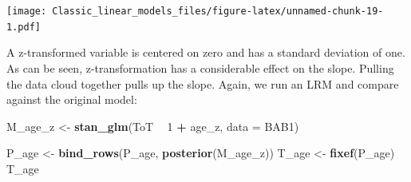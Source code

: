 \documentclass[]{svmono}
\newenvironment{Shaded}{\begin{snugshade}}{\end{snugshade}}
\newcommand{\KeywordTok}[1]{\textcolor[rgb]{0.13,0.29,0.53}{\textbf{#1}}}
\newcommand{\DataTypeTok}[1]{\textcolor[rgb]{0.13,0.29,0.53}{#1}}
\newcommand{\DecValTok}[1]{\textcolor[rgb]{0.00,0.00,0.81}{#1}}
\newcommand{\StringTok}[1]{\textcolor[rgb]{0.31,0.60,0.02}{#1}}
\newcommand{\OperatorTok}[1]{\textcolor[rgb]{0.81,0.36,0.00}{\textbf{#1}}}
\newcommand{\NormalTok}[1]{#1}
\theoremstyle{definition}
\theoremstyle{definition}
\theoremstyle{definition}
\theoremstyle{remark}
\begin{document}
\begin{Shaded}
\end{Shaded}

\texttt{[image: Classic\_linear\_models\_files/figure-latex/unnamed-chunk-19-1.pdf]}

A z-transformed variable is centered on zero and has a standard
deviation of one. As can be seen, z-transformation has a considerable
effect on the slope. Pulling the data cloud together pulls up the slope.
Again, we run an LRM and compare against the original model:

\begin{Shaded}
\begin{Highlighting}[]
\NormalTok{M_age_z <-}\StringTok{ }
\StringTok{  }\KeywordTok{stan_glm}\NormalTok{(ToT }\OperatorTok{~}\StringTok{ }\DecValTok{1} \OperatorTok{+}\StringTok{ }\NormalTok{age_z, }\DataTypeTok{data =}\NormalTok{ BAB1)}
\end{Highlighting}
\end{Shaded}

\begin{Shaded}
\begin{Highlighting}[]
\NormalTok{P_age <-}\StringTok{  }\KeywordTok{bind_rows}\NormalTok{(P_age, }\KeywordTok{posterior}\NormalTok{(M_age_z))}
\NormalTok{T_age <-}\StringTok{ }\KeywordTok{fixef}\NormalTok{(P_age)}
\NormalTok{T_age}
\end{Highlighting}
\end{Shaded}
\end{document}
